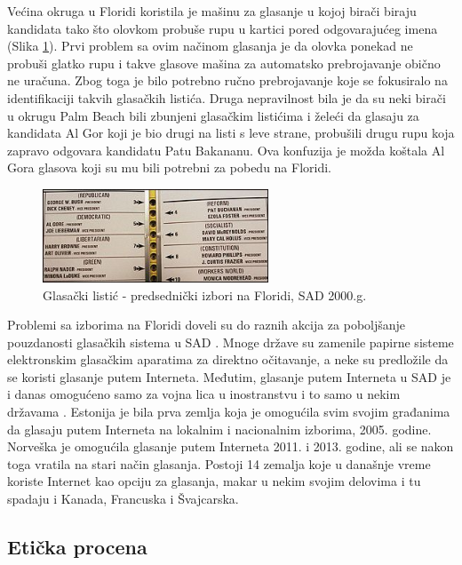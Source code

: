 \documentclass[a4paper]{article}
\theoremstyle{break}
\begin{document}
{Većina okruga u Floridi koristila je mašinu za glasanje u kojoj birači biraju kandidata tako što olovkom probuše rupu u kartici pored odgovarajućeg imena (Slika \ref{fig:butterfly_ballot}). Prvi problem sa ovim načinom glasanja je da olovka ponekad ne probuši glatko rupu i takve glasove mašina za automatsko prebrojavanje obično ne uračuna. Zbog toga je bilo potrebno ručno prebrojavanje koje se fokusiralo na identifikaciji takvih glasačkih listića. Druga nepravilnost bila je da su neki birači u okrugu Palm Beach bili zbunjeni glasačkim listićima i želeći da glasaju za kandidata Al Gor koji je bio drugi na listi s leve strane, probušili drugu rupu koja zapravo odgovara kandidatu Patu Bakananu. Ova konfuzija je možda koštala Al Gora glasova koji su mu bili potrebni za pobedu na Floridi.
\begin{figure}[h!]
\begin{center}
\includegraphics[width=0.6\textwidth]{butterfly_ballot.jpg}
\end{center}
\caption{Glasački listić - predsednički izbori na Floridi, SAD 2000.g.}
\label{fig:butterfly_ballot}
\end{figure}

Problemi sa izborima na Floridi doveli su do raznih akcija za poboljšanje pouzdanosti glasačkih sistema u SAD \cite{knjiga}. Mnoge države su zamenile papirne sisteme elektronskim glasačkim aparatima za direktno očitavanje, a neke su predložile da se koristi glasanje putem Interneta.
Međutim, glasanje putem Interneta u SAD je i danas omogućeno samo za vojna lica u inostranstvu i to samo u nekim državama \cite{i_voting}. Estonija je bila prva zemlja koja je omogućila svim svojim građanima da glasaju putem Interneta na lokalnim i nacionalnim izborima, 2005. godine. 
Norveška je omogućila glasanje putem Interneta 2011. i 2013. godine, ali se nakon toga vratila na stari način glasanja. Postoji 14 zemalja koje u današnje vreme koriste Internet kao opciju za glasanja, makar u nekim svojim delovima i tu spadaju i Kanada, Francuska i Švajcarska.

\subsection{Etička procena}
\label{subsec:Eticka procena}

}
\end{document}

